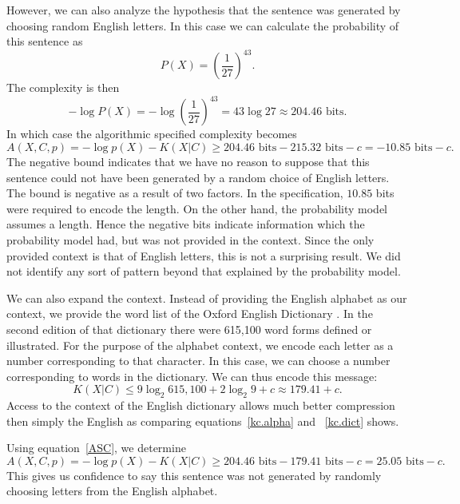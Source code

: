 However, we can also analyze the hypothesis that the sentence was generated by choosing random English letters.
In this case we can calculate the probability of this sentence as
\begin{equation}
    P(X) = \left(\frac{1}{27}\right)^{43} \mbox{.}
\end{equation}
The complexity is then
\begin{equation}
    -\log P(X) = -\log \left(\frac{1}{27}\right)^{43} = 43 \log 27 \approx 204.46 \mbox{ bits.}
\end{equation}
In which case the algorithmic specified complexity becomes
\begin{equation}
    A(X,C,p) = - \log p(X) - K(X|C) \geq 204.46 \mbox{ bits} - 215.32 \mbox{ bits} - c = -10.85 \mbox{ bits} - c \mbox{.}
\end{equation}
The negative bound indicates that we have no reason to suppose that this sentence could not have been generated by a random choice of English letters.
The bound is negative as a result of two factors.
In the specification, $10.85$ bits were required to encode the length.
On the other hand, the probability model assumes a length.
Hence the negative bits indicate information which the probability model had, but was not provided in the context.
Since the only provided context is that of English letters, this is not a surprising result.
We did not identify any sort of pattern beyond that explained by the probability model.

We can also expand the context.
Instead of providing the English alphabet as our context, we provide the word list of the Oxford English Dictionary \citep{Oxford2012}.
In the second edition of that dictionary there were 615,100 word forms defined or illustrated.
For the purpose of the alphabet context, we encode each letter as a number corresponding to that character.
In this case, we can choose a number corresponding to words in the dictionary.
We can thus encode this message:
\begin{equation}
    \label{kc.dict}
    K(X|C) \leq 9 \log_2  615,100 + 2 \log_2 9 + c \approx 179.41 + c \mbox{.}
\end{equation}
Access to the context of the English dictionary allows much better compression then simply the English as comparing equations~\ref{kc.alpha} and ~\ref{kc.dict} shows.

Using equation~\ref{ASC}, we determine
\begin{equation}
    A(X,C,p) = - \log p(X) - K(X|C) \geq 204.46 \mbox{ bits} - 179.41 \mbox{ bits} - c = 25.05 \mbox{ bits} - c \mbox{.}
\end{equation}
This gives us confidence to say this sentence was not generated by randomly choosing letters from the English alphabet.

